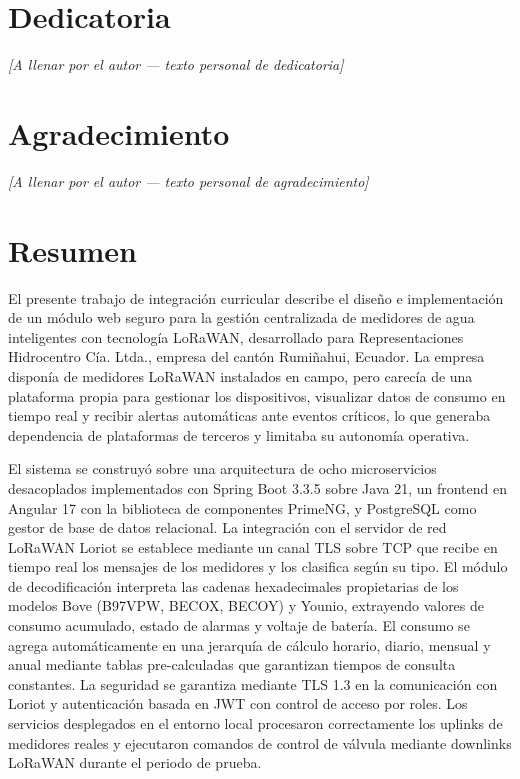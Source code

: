 \documentclass[12pt,a4paper,oneside]{report}
\begin{document}
\clearpage
\chapter*{Dedicatoria}

\emph{[A llenar por el autor --- texto personal de dedicatoria]}

\clearpage
\chapter*{Agradecimiento}

\emph{[A llenar por el autor --- texto personal de agradecimiento]}

\clearpage
\tableofcontents

\clearpage
\listoftables

\clearpage
\listoffigures

\clearpage
\chapter*{Resumen}

El presente trabajo de integración curricular describe el diseño e implementación de un módulo web seguro para la gestión centralizada de medidores de agua inteligentes con tecnología LoRaWAN, desarrollado para Representaciones Hidrocentro Cía. Ltda., empresa del cantón Rumiñahui, Ecuador. La empresa disponía de medidores LoRaWAN instalados en campo, pero carecía de una plataforma propia para gestionar los dispositivos, visualizar datos de consumo en tiempo real y recibir alertas automáticas ante eventos críticos, lo que generaba dependencia de plataformas de terceros y limitaba su autonomía operativa.

El sistema se construyó sobre una arquitectura de ocho microservicios desacoplados implementados con Spring Boot 3.3.5 sobre Java 21, un frontend en Angular 17 con la biblioteca de componentes PrimeNG, y PostgreSQL como gestor de base de datos relacional. La integración con el servidor de red LoRaWAN Loriot se establece mediante un canal TLS sobre TCP que recibe en tiempo real los mensajes de los medidores y los clasifica según su tipo. El módulo de decodificación interpreta las cadenas hexadecimales propietarias de los modelos Bove (B97VPW, BECOX, BECOY) y Younio, extrayendo valores de consumo acumulado, estado de alarmas y voltaje de batería. El consumo se agrega automáticamente en una jerarquía de cálculo horario, diario, mensual y anual mediante tablas pre-calculadas que garantizan tiempos de consulta constantes. La seguridad se garantiza mediante TLS 1.3 en la comunicación con Loriot y autenticación basada en JWT con control de acceso por roles. Los servicios desplegados en el entorno local procesaron correctamente los uplinks de medidores reales y ejecutaron comandos de control de válvula mediante downlinks LoRaWAN durante el periodo de prueba.
\end{document}
